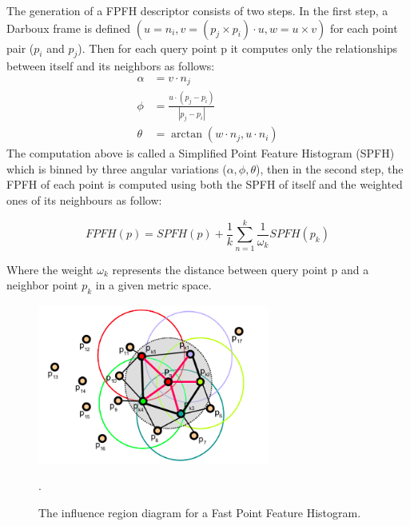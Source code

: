 The generation of a FPFH descriptor consists of two steps. In the first step, a Darboux frame is defined $(u=n_{i},v=(p_{j} \times p_{i}) \cdot u,w=u\times v)$ for each point pair ($p_{i}$ and $p_{j}$). Then for each query point p it computes only the relationships between itself and its neighbors as follows:
\begin{align}
    \alpha& = v \cdot n_{j}\nonumber \\
    \phi&= \frac{u \cdot (p_{j} - p_{i})}{|p_{j} - p_{i}|}\label{pfheq} \\
    \theta &= \arctan(w \cdot n_{j} , u \cdot n_{i})\nonumber
\end{align}
The computation above is called a Simplified Point Feature Histogram (SPFH) which is binned by three angular variations ($\alpha , \phi , \theta$), then in the second step, the FPFH of each point is computed using both the SPFH of itself and the weighted ones of its neighbours as follow:

\begin{equation}\label{fpfheq}
    FPFH(p) = SPFH(p)+\frac{1}{k}\sum\limits_{n=1}^{k}\frac{1}{\omega _{k}}SPFH(p_{k})
\end{equation}

Where the weight $\omega _{k}$ represents the distance between query point p and a neighbor point $p_{k}$ in a given metric space.

\begin{figure}[!h]
\begin{center}
\includegraphics[width=3in]{figures03/fpfh1.png}
\caption{The influence region diagram for a Fast Point Feature Histogram. \cite{algFpfh}}.
\label{fig:fpfh}
\end{center}
\end{figure}


































